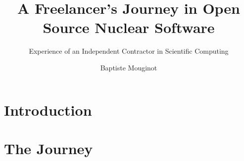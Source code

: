 

\title{A Freelancer's Journey in Open Source Nuclear Software}
\subtitle{Experience of an Independent Contractor in Scientific Computing}
\author{Baptiste Mouginot}



\begin{frame}[plain]
  \titlepage
\end{frame}

\section{Introduction}



\section{The Journey}


% 
% 
% 
% 
% 
% 


% 
% 
% 


% 
% 


% 

